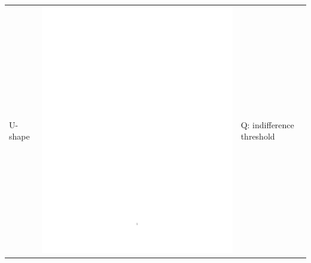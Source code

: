 \begin{enumerate}
\begin{table}[h!]
\begin{center}
\begin{tabular}{|l|c|b{4.2cm}|}
\hline U-shape & \includegraphics[page=2,trim=7.5cm 13.8cm 3.5cm 6.5cm,clip,scale=0.36]{prom_ushape_pdf} & Q: indifference threshold\\

\end{tabular}
\end{center}
\end{table}
\end{enumerate}
